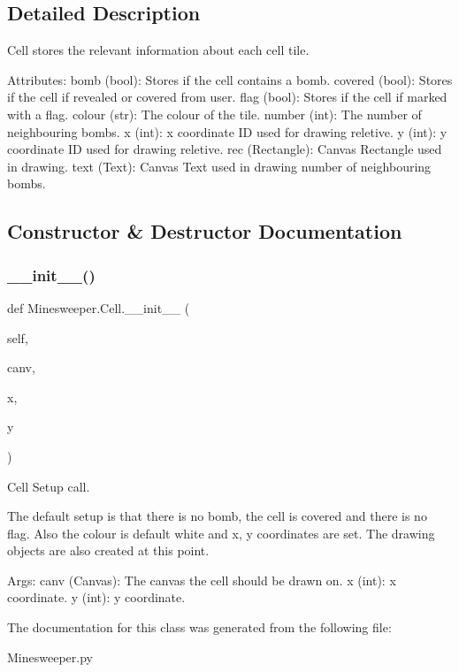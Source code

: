 \subsection{Detailed Description}
\begin{DoxyVerb}Cell stores the relevant information about each cell tile.

   Attributes:
   bomb (bool): Stores if the cell contains a bomb.
   covered (bool): Stores if the cell if revealed or covered from user.
   flag (bool): Stores if the cell if marked with a flag.
   colour (str): The colour of the tile.
   number (int): The number of neighbouring bombs.
   x (int): x coordinate ID used for drawing reletive.
   y (int): y coordinate ID used for drawing reletive.
   rec (Rectangle): Canvas Rectangle used in drawing.
   text (Text): Canvas Text used in drawing number of neighbouring bombs.\end{DoxyVerb}
 

\subsection{Constructor \& Destructor Documentation}
\mbox{\label{class_minesweeper_1_1_cell_a90721693b3d271396e733f3ca07047bb}} 
\subsubsection{\texorpdfstring{\+\_\+\+\_\+init\+\_\+\+\_\+()}{\_\_init\_\_()}}
{\footnotesize\ttfamily def Minesweeper.\+Cell.\+\_\+\+\_\+init\+\_\+\+\_\+ (\begin{DoxyParamCaption}\item[{}]{self,  }\item[{}]{canv,  }\item[{}]{x,  }\item[{}]{y }\end{DoxyParamCaption})}

\begin{DoxyVerb}Cell Setup call.

The default setup is that there is no bomb, the cell is covered and there
is no flag. Also the colour is default white and x, y coordinates are set.
The drawing objects are also created at this point.

Args:
    canv (Canvas): The canvas the cell should be drawn on.
    x (int): x coordinate.
    y (int): y coordinate.\end{DoxyVerb}
 

The documentation for this class was generated from the following file\+:\begin{DoxyCompactItemize}
\item 
Minesweeper.\+py\end{DoxyCompactItemize}
